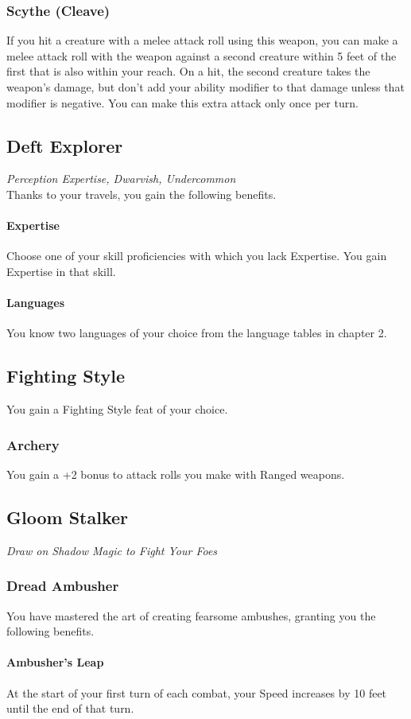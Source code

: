 \documentclass[letterpaper,openany,oneside,twocolumn]{book}
\begin{document}
\subsubsection*{Scythe (Cleave)}
If you hit a creature with a melee attack roll using this weapon, you can make a melee attack roll with the weapon against a second creature within 5 feet of the first that is also within your reach. On a hit, the second creature takes the weapon's damage, but don't add your ability modifier to that damage unless that modifier is negative. You can make this extra attack only once per turn.
\subsection*{Deft Explorer}
\textit{Perception Expertise, Dwarvish, Undercommon}\\
Thanks to your travels, you gain the following benefits.
\paragraph*{Expertise} Choose one of your skill proficiencies with which you lack Expertise. You gain Expertise in that skill.
\paragraph*{Languages} You know two languages of your choice from the language tables in chapter 2.
\subsection*{Fighting Style}
You gain a Fighting Style feat of your choice.
\subsubsection*{Archery}
You gain a +2 bonus to attack rolls you make with Ranged weapons.
\subsection*{Gloom Stalker}
\textit{Draw on Shadow Magic to Fight Your Foes}
\subsubsection*{Dread Ambusher}
You have mastered the art of creating fearsome ambushes, granting you the following benefits.
\paragraph*{Ambusher's Leap} At the start of your first turn of each combat, your Speed increases by 10 feet until the end of that turn.
\end{document}
